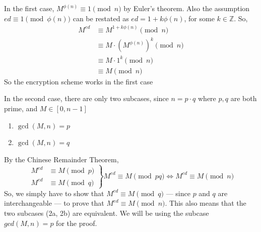 \documentclass[12pt, titlepage]{article}
\begin{document}
        In the first case, $M^{\phi(n)} \equiv 1 \pmod{n}$ by Euler's theorem. Also the
        assumption $ed \equiv 1 \pmod{\phi(n)}$ can be restated as $ed = 1 + k\phi(n)$, for
        some $k \in \mathbb{Z}$. So, 
        \begin{align*}
            M^{ed} &\equiv M^{1 + k\phi(n)} \pmod{n} \\
                   &\equiv M \cdot (M^{\phi(n)})^k  \pmod{n} \\
                   &\equiv M \cdot 1^k \pmod{n} \\
                   &\equiv M \pmod{n}
        \end{align*}
        So the encryption scheme works in the first case

        In the second case, there are only two subcases, since $n = p \cdot q$ where $p, q$
        are both prime, and $ M \in \left[0, n-1\right]$
        \renewcommand{\labelenumi}{2\alph{enumi}.}
        \begin{enumerate}
            \item $\gcd(M, n) = p$
            \item $\gcd(M, n) = q$
        \end{enumerate}
        

        
        By the Chinese Remainder Theorem,
        \begin{equation*}
            \left.
                \begin{aligned}
                    M^{ed} &\equiv M \pmod{p}\\
                    M^{ed} &\equiv M \pmod{q}
                \end{aligned}
            \right\}
            M^{ed} \equiv M \pmod{pq} \iff M^{ed} \equiv M \pmod{n}
        \end{equation*}
        So, we simply have to show that $M^{ed} \equiv M \pmod{q}$ --- since $p$ and $q$ are
        interchangeable --- to prove that $M^{ed} \equiv M \pmod{n}$. This also means that
        the two subcases (2a, 2b) are equivalent. We will be using the subcase $gcd(M, n) =
        p$ for the proof.
        
\end{document}
